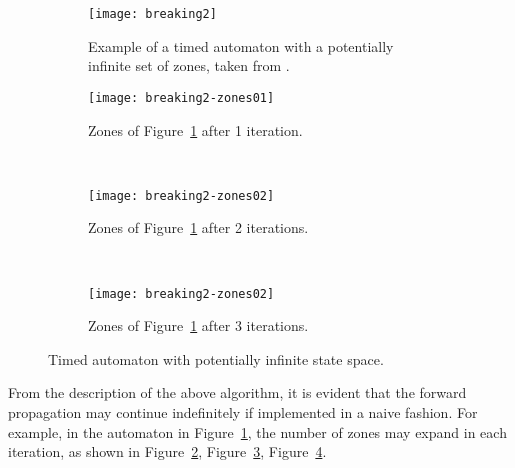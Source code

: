 \documentclass{article}
\begin{document}
\begin{figure}
  \centering
  \begin{subfigure}[b]{\textwidth}
    \centering
    \texttt{[image: breaking2]}
    \caption{Example of a timed automaton with a potentially infinite
      set of zones, taken from \cite{Behrmann03staticguard}.}
    \label{breaking2}
  \end{subfigure}%

  \begin{subfigure}[b]{0.3\textwidth}
    \centering
    \texttt{[image: breaking2-zones01]}
    \caption{Zones of Figure~\ref{breaking2} after 1 iteration.}
    \label{breaking2-zones01}
  \end{subfigure}
  ~ %
  \begin{subfigure}[b]{0.3\textwidth}
    \centering
    \texttt{[image: breaking2-zones02]}
    \caption{Zones of Figure~\ref{breaking2} after 2 iterations.}
    \label{breaking2-zones02}
  \end{subfigure}
  ~ %
  \begin{subfigure}[b]{0.3\textwidth}
    \centering
    \texttt{[image: breaking2-zones02]}
    \caption{Zones of Figure~\ref{breaking2} after 3 iterations.}
    \label{breaking2-zones03}
  \end{subfigure}
  \caption{Timed automaton with potentially infinite state space.}\label{breaking2withzones}
\end{figure}

From the description of the above algorithm, it is evident that the
forward propagation may continue indefinitely if implemented in a
naive fashion. For example, in the automaton in
Figure~\ref{breaking2}, the number of zones may expand in each
iteration, as shown in Figure~\ref{breaking2-zones01},
Figure~\ref{breaking2-zones02}, Figure~\ref{breaking2-zones03}.



\end{document}
